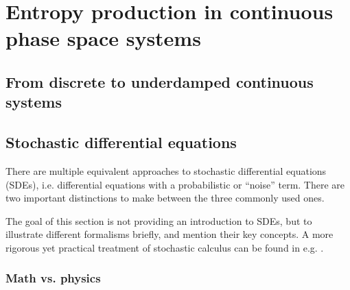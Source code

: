\chapter{Entropy production in continuous phase space systems}
\label{chap:flow}

\section{From discrete to underdamped continuous systems}





\section{Stochastic differential equations}

There are multiple equivalent approaches to stochastic differential equations (SDEs), i.e. differential equations with a probabilistic or ``noise'' term. There are two important distinctions to make between the three commonly used ones.

The goal of this section is not providing an introduction to SDEs, but to illustrate different formalisms briefly, and mention their key concepts. A more rigorous yet practical treatment of stochastic calculus can be found in e.g. .

\subsection{Math vs. physics}

